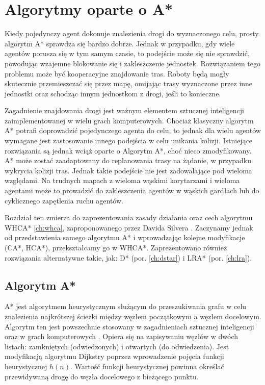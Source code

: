 \chapter{Algorytmy oparte o A*}
\label{ch:astar}

Kiedy pojedynczy agent dokonuje znalezienia drogi do wyznaczonego celu, prosty algorytm A* sprawdza się bardzo dobrze. Jednak w przypadku, gdy wiele agentów porusza się w tym samym czasie, to podejście może się nie sprawdzić, powodując wzajemne blokowanie się i zakleszczenie jednostek. Rozwiązaniem tego problemu może być kooperacyjne znajdowanie tras. Roboty będą mogły skutecznie przemieszczać się przez mapę, omijając trasy wyznaczone przez inne jednostki oraz schodząc innym jednostkom z drogi, jeśli to konieczne. \cite{cooppath}

Zagadnienie znajdowania drogi jest ważnym elementem sztucznej inteligencji zaimplementowanej w wielu grach komputerowych. Chociaż klasyczny algorytm A* potrafi doprowadzić pojedynczego agenta do celu, to jednak dla wielu agentów wymagane jest zastosowanie innego podejścia w celu unikania kolizji. Istniejące rozwiązania są jednak wciąż oparte o Algorytm A*, choć nieco zmodyfikowany. A* może zostać zaadaptowany do replanowania trasy na żądanie, w przypadku wykrycia kolizji tras. Jednak takie podejście nie jest zadowalające pod wieloma względami. Na trudnych mapach z wieloma wąskimi korytarzami i wieloma agentami może to prowadzić do zakleszczenia agentów w wąskich gardłach lub do cyklicznego zapętlenia ruchu agentów. \cite{cooppath}

Rozdział ten zmierza do zaprezentowania zasady działania oraz cech algorytmu WHCA* \ref{ch:whca}, zaproponowanego przez Davida Silvera \cite{cooppath}. Zaczynamy jednak od przedstawienia samego algorytmu A* i wprowadzając kolejne modyfikacje (CA*, HCA*), przekształcamy go w WHCA*.
Zaprezentowano również rozwiązania alternatywne takie, jak: D* (por. \ref{ch:dstar}) i LRA* (por. \ref{ch:lra}).

\section{Algorytm A*}
A* jest algorytmem heurystycznym służącym do przeszukiwania grafu w celu znalezienia najkrótszej ścieżki między węzłem początkowym a węzłem docelowym. Algorytm ten jest powszechnie stosowany w zagadnieniach sztucznej inteligencji oraz w grach komputerowych \cite{mit_astar}. Opiera się na zapisywaniu węzłów w dwóch listach: zamkniętych (odwiedzonych) i otwartych (do odwiedzenia). Jest modyfikacją algorytmu Dijkstry poprzez wprowadzenie pojęcia funkcji heurystycznej $h(n)$. Wartość funkcji heurystycznej powinna określać przewidywaną drogę do węzła docelowego z bieżącego punktu. 

